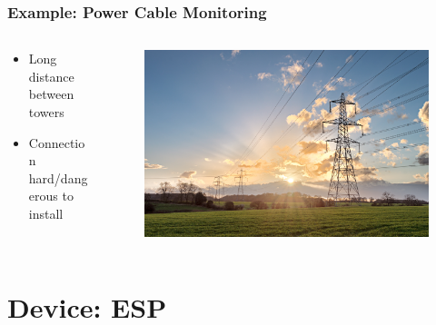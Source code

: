 \documentclass[compress, aspectratio=32]{beamer}
\begin{document}
\begin{frame}
    \frametitle{Example: Power Cable Monitoring}
    \begin{columns}
        \begin{column}{0.4\textwidth}
            \begin{itemize}
                \item Long distance between towers
                \item Connection hard/dangerous to install
            \end{itemize}
        \end{column}
        \begin{column}{0.6\textwidth}
            \begin{figure}
                \includegraphics[width=\textwidth]{AdobeStock_133386757.jpeg}
            \end{figure}
        \end{column}
    \end{columns}
\end{frame}

\section{Device: ESP}
\end{document}
